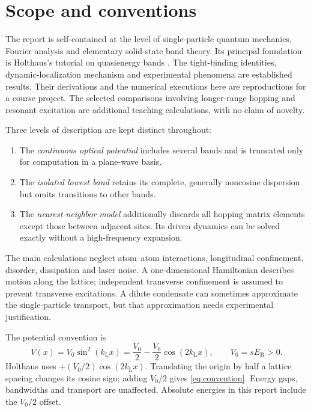 \documentclass[11pt,oneside]{report}
\numberwithin{equation}{chapter}
\newcommand{\ER}{E_{\mathrm R}}
\begin{document}
\chapter*{Scope and conventions}
The report is self-contained at the level of single-particle quantum mechanics, Fourier analysis and elementary solid-state band theory. Its principal foundation is Holthaus's tutorial on quasienergy bands \cite{Holthaus2016}. The tight-binding identities, dynamic-localization mechanism and experimental phenomena are established results. Their derivations and the numerical executions here are reproductions for a course project. The selected comparisons involving longer-range hopping and resonant excitation are additional teaching calculations, with no claim of novelty.

Three levels of description are kept distinct throughout:
\begin{enumerate}
\item The \emph{continuous optical potential} includes several bands and is truncated only for computation in a plane-wave basis.
\item The \emph{isolated lowest band} retains its complete, generally noncosine dispersion but omits transitions to other bands.
\item The \emph{nearest-neighbor model} additionally discards all hopping matrix elements except those between adjacent sites. Its driven dynamics can be solved exactly without a high-frequency expansion.
\end{enumerate}
The main calculations neglect atom--atom interactions, longitudinal confinement, disorder, dissipation and laser noise. A one-dimensional Hamiltonian describes motion along the lattice; independent transverse confinement is assumed to prevent transverse excitations. A dilute condensate can sometimes approximate the single-particle transport, but that approximation needs experimental justification.

The potential convention is
\begin{equation}\label{eq:convention}
 V(x)=V_0\sin^2(k_{\mathrm L}x)=\frac{V_0}{2}-\frac{V_0}{2}\cos(2k_{\mathrm L}x),\qquad V_0=s\ER>0.
\end{equation}
Holthaus uses $+(V_0/2)\cos(2k_{\mathrm L}x)$. Translating the origin by half a lattice spacing changes its cosine sign; adding $V_0/2$ gives \cref{eq:convention}. Energy gaps, bandwidths and transport are unaffected. Absolute energies in this report include the $V_0/2$ offset.
\end{document}
